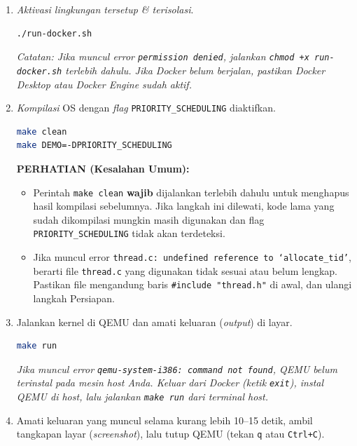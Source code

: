 \begin{enumerate}
	\item \textit{Aktivasi lingkungan tersetup \& terisolasi}.
	      \begin{lstlisting}[language=bash, caption={Menjalankan Docker menggunakan script}]
./run-docker.sh
    \end{lstlisting}

	      \textit{Catatan: Jika muncul error \texttt{permission denied}, jalankan \texttt{chmod +x run-docker.sh} terlebih dahulu. Jika Docker belum berjalan, pastikan Docker Desktop atau Docker Engine sudah aktif.}

	\item \textit{Kompilasi} OS dengan \textit{flag} \texttt{PRIORITY\_SCHEDULING} diaktifkan.
	      \begin{lstlisting}[language=bash, caption={Kompilasi dengan flag PRIORITY\_SCHEDULING}]
make clean
make DEMO=-DPRIORITY_SCHEDULING
    \end{lstlisting}

	      \textbf{PERHATIAN (Kesalahan Umum):}
	      \begin{itemize}
		      \item Perintah \texttt{make clean} \textbf{wajib} dijalankan terlebih dahulu untuk menghapus hasil kompilasi sebelumnya. Jika langkah ini dilewati, kode lama yang sudah dikompilasi mungkin masih digunakan dan flag \texttt{PRIORITY\_SCHEDULING} tidak akan terdeteksi.
		      \item Jika muncul error \texttt{thread.c: undefined reference to `allocate\_tid'}, berarti file \texttt{thread.c} yang digunakan tidak sesuai atau belum lengkap. Pastikan file mengandung baris \texttt{\#include "thread.h"} di awal, dan ulangi langkah Persiapan.
	      \end{itemize}

	\item Jalankan kernel di QEMU dan amati keluaran (\textit{output}) di layar.
	      \begin{lstlisting}[language=bash, caption={Menjalankan kernel di QEMU}]
make run
    \end{lstlisting}

	      \textit{Jika muncul error \texttt{qemu-system-i386: command not found}, QEMU belum terinstal pada mesin host Anda. Keluar dari Docker (ketik \texttt{exit}), instal QEMU di host, lalu jalankan \texttt{make run} dari terminal host.}

	\item Amati keluaran yang muncul selama kurang lebih 10--15 detik, ambil tangkapan layar (\textit{screenshot}), lalu tutup QEMU (tekan \texttt{q} atau \texttt{Ctrl+C}).


\end{enumerate}
